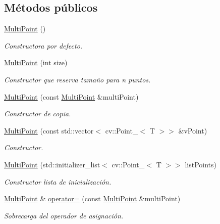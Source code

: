 \subsection*{Métodos públicos}
\begin{DoxyCompactItemize}
\item 
\hyperlink{group___geometric_entities_ga15cd19a3ddf5a39c3154efe440dde6c7}{Multi\+Point} ()
\begin{DoxyCompactList}\small\item\em Constructora por defecto. \end{DoxyCompactList}\item 
\hyperlink{group___geometric_entities_ga5581044092b6db2870f35347c8af5b73}{Multi\+Point} (int size)
\begin{DoxyCompactList}\small\item\em Constructor que reserva tamaño para n puntos. \end{DoxyCompactList}\item 
\hyperlink{group___geometric_entities_gaadc33d9d15e6fe63040915f1f39d9b40}{Multi\+Point} (const \hyperlink{class_i3_d_1_1_multi_point}{Multi\+Point} \&multi\+Point)
\begin{DoxyCompactList}\small\item\em Constructor de copia. \end{DoxyCompactList}\item 
\hyperlink{group___geometric_entities_ga4f8daff9e4ffbfcb5f1cc670f4e3681c}{Multi\+Point} (const std\+::vector$<$ cv\+::\+Point\+\_\+$<$ T $>$$>$ \&v\+Point)
\begin{DoxyCompactList}\small\item\em Constructor. \end{DoxyCompactList}\item 
\hyperlink{group___geometric_entities_ga5e9b29cc4e72496e3c0df560bcaf39d4}{Multi\+Point} (std\+::initializer\+\_\+list$<$ cv\+::\+Point\+\_\+$<$ T $>$$>$ list\+Points)
\begin{DoxyCompactList}\small\item\em Constructor lista de inicialización. \end{DoxyCompactList}\item 
\hyperlink{class_i3_d_1_1_multi_point}{Multi\+Point} \& \hyperlink{group___geometric_entities_ga006fc08c663fc30e8f7f5dce0655bf96}{operator=} (const \hyperlink{class_i3_d_1_1_multi_point}{Multi\+Point} \&multi\+Point)
\begin{DoxyCompactList}\small\item\em Sobrecarga del operador de asignación. \end{DoxyCompactList}\item 

\end{DoxyCompactItemize}
